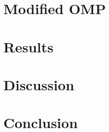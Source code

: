 \documentclass[journal]{IEEEtran}
\begin{document}
\section{Modified OMP}


\section{Results}


\section{Discussion}


\section{Conclusion}
\end{document}
